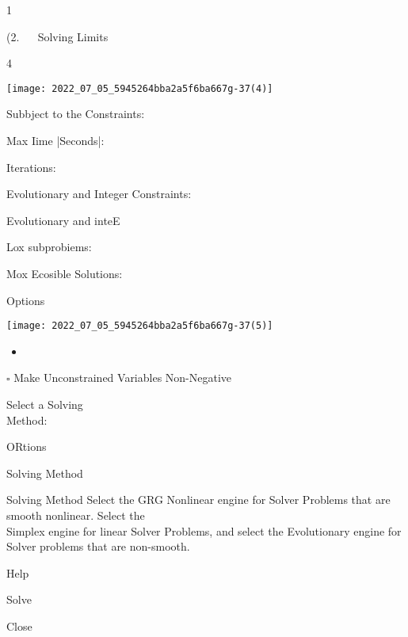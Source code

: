 1

(2. $\quad$ Solving Limits

4

\texttt{[image: 2022\_07\_05\_5945264bba2a5f6ba667g-37(4)]}

Subbject to the Constraints:

Max Iime |Seconds|:

Iterations:

Evolutionary and Integer Constraints:

Evolutionary and inteE

Lox subprobiems:

Mox Ecosible Solutions:

Options

\texttt{[image: 2022\_07\_05\_5945264bba2a5f6ba667g-37(5)]}

\begin{itemize}
  \item 
\end{itemize}
$\square$ Make Unconstrained Variables Non-Negative

Select a Solving\\
Method:

ORtions

Solving Method

Solving Method Select the GRG Nonlinear engine for Solver Problems that are smooth nonlinear. Select the\\
Simplex engine for linear Solver Problems, and select the Evolutionary engine for Solver problems that are non-smooth.

Help

Solve

Close
